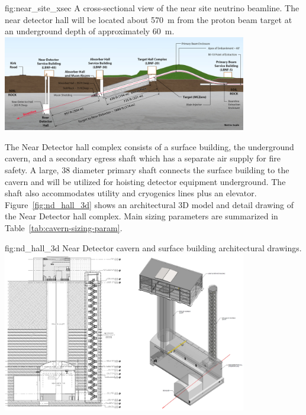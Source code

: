 \begin{dunefigure}{fig:near_site_xsec}
{A cross-sectional view of the near site neutrino beamline. The near detector hall will be located about \SI{570}{\m} from the proton beam target at an underground depth of approximately \SI{60}{\m}.}
\includegraphics[width=0.8\textwidth]{graphics/i-and-i/near_site_xsec.jpg}
\end{dunefigure}

The Near Detector hall complex consists of a surface building, the underground cavern, and a secondary egress shaft which has a separate air supply for fire safety. A large, \SI{38}{\ft} diameter primary shaft connects the surface building to the cavern and will be utilized for hoisting detector equipment underground. The shaft also accommodates utility and cryogenics lines plus an elevator. Figure~\ref{fig:nd_hall_3d} shows an architectural 3D model and detail drawing of the Near Detector hall complex. Main sizing parameters are summarized in Table~\ref{tab:cavern-sizing-param}.

\begin{dunefigure}{fig:nd_hall_3d}
{Near Detector cavern and surface building architectural drawings.}
\includegraphics[width=0.8\textwidth]{graphics/i-and-i/nd_hall_3d}
\end{dunefigure}


